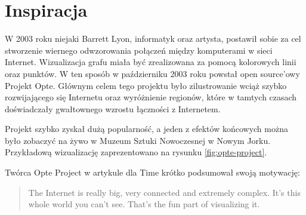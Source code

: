 \section{Inspiracja}
W 2003 roku niejaki Barrett Lyon, informatyk oraz artysta, postawił sobie za cel stworzenie wiernego odwzorowania połączeń między komputerami w sieci Internet. Wizualizacja grafu miała być zrealizowana za pomocą kolorowych linii oraz punktów. W ten sposób w październiku 2003 roku powstał open source'owy Projekt Opte. Głównym celem tego projektu było zilustrowanie wciąż szybko rozwijającego się Internetu oraz wyróżnienie regionów, które w tamtych czasach doświadczały gwałtownego wzrostu łączności z Internetem.

Projekt szybko zyskał dużą popularność, a jeden z efektów końcowych można było zobaczyć na żywo w Muzeum Sztuki Nowoczesnej w Nowym Jorku. Przykładową wizualizację zaprezentowano na rysunku \ref{fig:opte-project}.

Twórca Opte Project w artykule dla Time \cite{OpteProject:Time} krótko podsumował swoją motywację:

\begin{center}
	\hyphenblockcquote{USenglish}{OpteProject:Time}{
		The Internet is really big, very connected and extremely complex. \linebreak
		It’s this whole world you can’t see. That’s the fun part of visualizing it.
	}
\end{center}

